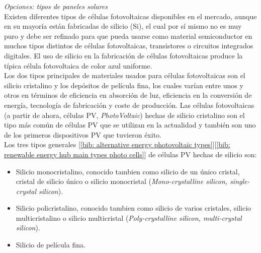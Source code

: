 \documentclass[12pt]{article}
\begin{document}
	\pagebreak
	
	
	
	
	\noindent \textit{Opciones: tipos de paneles solares}\\
	
	\noindent Existen diferentes tipos de células fotovoltaicas disponibles en el mercado, aunque en su mayoría están fabricadas de silicio (Si), el cual por sí mismo no es muy puro y debe ser refinado para que pueda usarse como material semiconductor en muchos tipos distintos de células fotovoltaicas, transistores o circuitos integrados digitales. El uso de silicio en la fabricación de células fotovoltaicas produce la típica célula fotovoltaica de color azul uniforme. \\
	\noindent Los dos tipos principales de materiales usados para células fotovoltaicas son el silicio cristalino y los depósitos de película fina, los cuales varían entre unos y otros en términos de eficiencia en absorción de luz, eficiencia en la conversión de energía, tecnología de fabricación y coste de producción. Las células fotovoltaicas (a partir de ahora, células PV, \textit{PhotoVoltaic}) hechas de silicio cristalino son el tipo más común de células PV que se utilizan en la actualidad y también son uno de los primeros dispositivos PV que tuvieron éxito.\\
	
	\noindent Los tres tipos generales [\ref{bib: alternative energy photovoltaic types}][\ref{bib: renewable energy hub main types photo cells}] de células PV hechas de silicio son:
	
	\begin{itemize}
		\item Silicio monocristalino, conocido tambien como silicio de un único cristal, cristal de silicio único o silicio monocristal (\textit{Mono-crystalline silicon, single-crystal silicon}).
		\item Silicio policristalino, conocido tambien como silicio de varios cristales, silicio multicristalino o silicio multicristal (\textit{Poly-crystalline silicon, multi-crystal silicon}).
		\item Silicio de película fina. \\
	\end{itemize}
\end{document}
